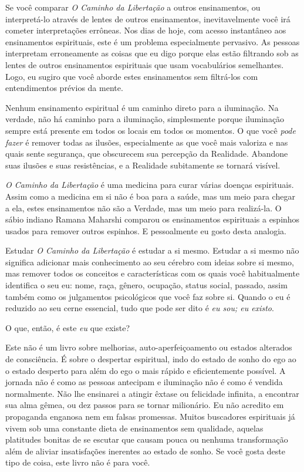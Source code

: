 Se você comparar \emph{O Caminho da Libertação} a outros ensinamentos, ou interpretá-lo através de lentes de outros ensinamentos, inevitavelmente você irá cometer interpretações errôneas. Nos dias de hoje, com acesso instantâneo aos ensinamentos espirituais, este é um problema especialmente pervasivo. As pessoas interpretam erroneamente as coisas que eu digo porque elas estão filtrando sob as lentes de outros ensinamentos espirituais que usam vocabulários semelhantes. Logo, eu sugiro que você aborde estes ensinamentos sem filtrá-los com entendimentos prévios da mente.

Nenhum ensinamento espiritual é um caminho direto para a iluminação. Na verdade, não há caminho para a iluminação, simplesmente porque iluminação sempre está presente em todos os locais em todos os momentos. O que você \emph{pode fazer} é remover todas as ilusões, especialmente as que você mais valoriza e nas quais sente segurança, que obscurecem sua percepção da Realidade. Abandone suas ilusões e suas resistências, e a Realidade subitamente se tornará visível.

\emph{O Caminho da Libertação} é uma medicina para curar várias doenças espirituais. Assim como a medicina em si não é boa para a saúde, mas um meio para chegar a ela, estes ensinamentos não são a Verdade, mas um meio para realizá-la. O sábio indiano Ramana Maharshi comparou os ensinamentos espirituais a espinhos usados para remover outros espinhos. E pessoalmente eu gosto desta analogia.

Estudar \emph{O Caminho da Libertação} é estudar a si mesmo. Estudar a si mesmo não significa adicionar mais conhecimento ao seu cérebro com ideias sobre si mesmo, mas remover todos os conceitos e características com os quais você habitualmente identifica o seu eu: nome, raça, gênero, ocupação, status social, passado, assim também como os julgamentos psicológicos que você faz sobre si. Quando o eu é reduzido ao seu cerne essencial, tudo que pode ser dito é \emph{eu sou; eu existo}.

O que, então, é este \emph{eu} que existe?

Este não é um livro sobre melhorias, auto-aperfeiçoamento ou estados alterados de consciência. É sobre o despertar espiritual, indo do estado de sonho do ego ao o estado desperto para além do ego o mais rápido e eficientemente possível. A jornada não é como as pessoas antecipam e iluminação não é como é vendida normalmente. Não lhe ensinarei a atingir êxtase ou felicidade infinita, a encontrar sua alma gêmea, ou dez passos para se tornar milionário. Eu não acredito em propaganda enganosa nem em falsas promessas. Muitos buscadores espirituais já vivem sob uma constante dieta de ensinamentos sem qualidade, aquelas platitudes bonitas de se escutar que causam pouca ou nenhuma transformação além de aliviar insatisfações inerentes ao estado de sonho. Se você gosta deste tipo de coisa, este livro não é para você.

